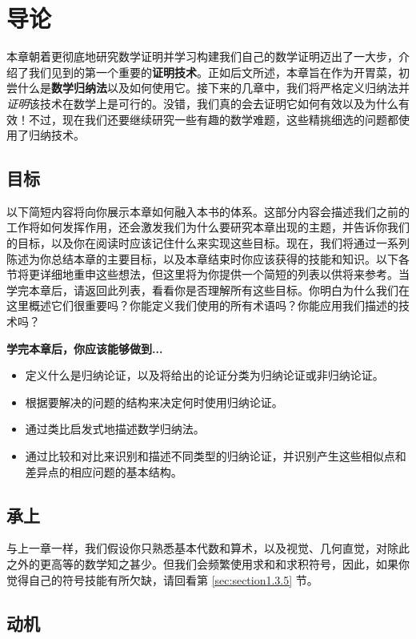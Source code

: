 \section{导论}

本章朝着更彻底地研究数学证明并学习构建我们自己的数学证明迈出了一大步，介绍了我们见到的第一个重要的\textbf{证明技术}。正如后文所述，本章旨在作为开胃菜，初尝什么是\textbf{数学归纳法}以及如何使用它。接下来的几章中，我们将严格定义归纳法并\emph{证明}该技术在数学上是可行的。没错，我们真的会去证明它如何有效以及为什么有效！不过，现在我们还要继续研究一些有趣的数学难题，这些精挑细选的问题都使用了归纳技术。

\subsection{目标}

以下简短内容将向你展示本章如何融入本书的体系。这部分内容会描述我们之前的工作将如何发挥作用，还会激发我们为什么要研究本章出现的主题，并告诉你我们的目标，以及你在阅读时应该记住什么来实现这些目标。现在，我们将通过一系列陈述为你总结本章的主要目标，以及本章结束时你应该获得的技能和知识。以下各节将更详细地重申这些想法，但这里将为你提供一个简短的列表以供将来参考。当学完本章后，请返回此列表，看看你是否理解所有这些目标。你明白为什么我们在这里概述它们很重要吗？你能定义我们使用的所有术语吗？你能应用我们描述的技术吗？

\textbf{学完本章后，你应该能够做到...}

\begin{itemize}
    \item 定义什么是归纳论证，以及将给出的论证分类为归纳论证或非归纳论证。
    \item 根据要解决的问题的结构来决定何时使用归纳论证。
    \item 通过类比启发式地描述数学归纳法。
    \item 通过比较和对比来识别和描述不同类型的归纳论证，并识别产生这些相似点和差异点的相应问题的基本结构。
\end{itemize}

\subsection{承上}

与上一章一样，我们假设你只熟悉基本代数和算术，以及视觉、几何直觉，对除此之外的更高等的数学知之甚少。但我们会频繁使用求和和求积符号，因此，如果你觉得自己的符号技能有所欠缺，请回看第 \ref{sec:section1.3.5} 节。

\subsection{动机}

